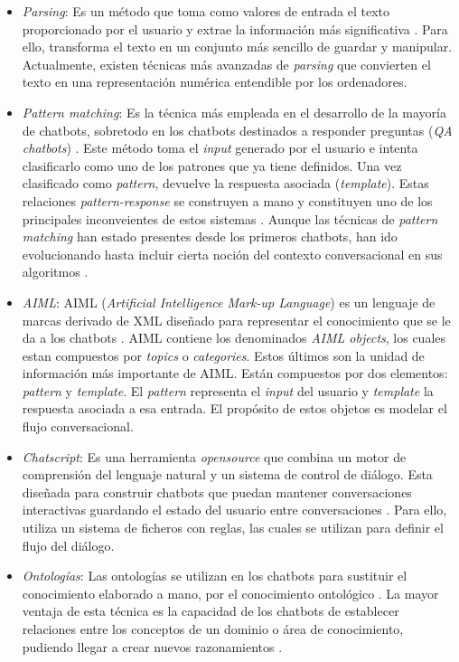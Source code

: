\begin{itemize}
	\item \textit{Parsing}: Es un método que toma como valores de entrada el texto proporcionado por el usuario y extrae la información más significativa \cite{designTechniques}. Para ello, transforma el texto en un conjunto más sencillo de guardar y manipular. Actualmente, existen técnicas más avanzadas de \textit{parsing} que convierten el texto en una representación numérica entendible por los ordenadores.
	\item \textit{Pattern matching}: Es la técnica más empleada en el desarrollo de la mayoría de chatbots, sobretodo en los chatbots destinados a responder preguntas (\textit{QA chatbots}) \cite{designTechniques,conversationSystems}. Este método toma el \textit{input} generado por el usuario e intenta clasificarlo como uno de los patrones que ya tiene definidos. Una vez clasificado como \textit{pattern}, devuelve la respuesta asociada (\textit{template}). Estas relaciones \textit{pattern-response} se construyen a mano y constituyen uno de los principales inconveientes de estos sistemas \cite{designTechniques}. Aunque las técnicas de \textit{pattern matching} han estado presentes desde los primeros chatbots, han ido evolucionando hasta incluir cierta noción del contexto conversacional en sus algoritmos \cite{designTechniques}. 
	\item \textit{AIML}: AIML (\textit{Artificial Intelligence Mark-up Language}) es un lenguaje de marcas derivado de XML diseñado para representar el conocimiento que se le da a los chatbots \cite{conversationSystems}. AIML contiene los denominados \textit{AIML objects}, los cuales estan compuestos por \textit{topics} o \textit{categories}. Estos últimos son la unidad de información más importante de AIML. Están compuestos por dos elementos: \textit{pattern} y \textit{template}. El \textit{pattern} representa el \textit{input} del usuario y \textit{template} la respuesta asociada a esa entrada. El propósito de estos objetos es modelar el flujo conversacional.
	\item \textit{Chatscript}: Es una herramienta \textit{opensource} que combina un motor de comprensión del lenguaje natural y un sistema de control de diálogo. Esta diseñada para construir chatbots que puedan mantener conversaciones interactivas guardando el estado del usuario entre conversaciones \cite{designTechniques}. Para ello, utiliza un sistema de ficheros con reglas, las cuales se utilizan para definir el flujo del diálogo.
	\item \textit{Ontologías}: Las ontologías se utilizan en los chatbots para sustituir el conocimiento elaborado a mano, por el conocimiento ontológico \cite{designTechniques}. La mayor ventaja de esta técnica es la capacidad de los chatbots de establecer relaciones entre los conceptos de un dominio o área de conocimiento, pudiendo llegar a crear nuevos razonamientos \cite{designTechniques}.

\end{itemize}
